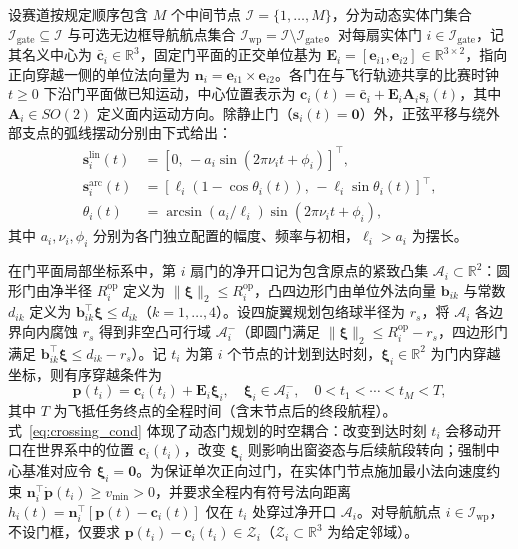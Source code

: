 \documentclass[journal]{IEEEtran}
\begin{document}
设赛道按规定顺序包含 $M$ 个中间节点 $\mathcal{I} = \{1, \ldots, M\}$，分为动态实体门集合 $\mathcal{I}_{\mathrm{gate}} \subseteq \mathcal{I}$ 与可选无边框导航航点集合 $\mathcal{I}_{\mathrm{wp}} = \mathcal{I} \setminus \mathcal{I}_{\mathrm{gate}}$。对每扇实体门 $i \in \mathcal{I}_{\mathrm{gate}}$，记其名义中心为 $\bar{\mathbf{c}}_i \in \mathbb{R}^3$，固定门平面的正交单位基为 $\mathbf{E}_i = [\mathbf{e}_{i1}, \mathbf{e}_{i2}] \in \mathbb{R}^{3 \times 2}$，指向正向穿越一侧的单位法向量为 $\mathbf{n}_i = \mathbf{e}_{i1} \times \mathbf{e}_{i2}$。各门在与飞行轨迹共享的比赛时钟 $t \ge 0$ 下沿门平面做已知运动，中心位置表示为 $\mathbf{c}_i(t) = \bar{\mathbf{c}}_i + \mathbf{E}_i \mathbf{A}_i \mathbf{s}_i(t)$，其中 $\mathbf{A}_i \in SO(2)$ 定义面内运动方向。除静止门（$\mathbf{s}_i(t) = \mathbf{0}$）外，正弦平移与绕外部支点的弧线摆动分别由下式给出：
\begin{equation}
\begin{aligned}
\mathbf{s}_i^{\mathrm{lin}}(t) &= [0,\, -a_i \sin(2\pi \nu_i t + \phi_i)]^\top, \\
\mathbf{s}_i^{\mathrm{arc}}(t) &= [\ell_i(1 - \cos\theta_i(t)),\, -\ell_i \sin\theta_i(t)]^\top, \\
\theta_i(t) &= \arcsin(a_i / \ell_i)\sin(2\pi \nu_i t + \phi_i),
\end{aligned}
\label{eq:gate_motion}
\end{equation}
其中 $a_i, \nu_i, \phi_i$ 分别为各门独立配置的幅度、频率与初相，$\ell_i > a_i$ 为摆长。

在门平面局部坐标系中，第 $i$ 扇门的净开口记为包含原点的紧致凸集 $\mathcal{A}_i \subset \mathbb{R}^2$：圆形门由净半径 $R_i^{\mathrm{op}}$ 定义为 $\|\boldsymbol{\xi}\|_2 \le R_i^{\mathrm{op}}$，凸四边形门由单位外法向量 $\mathbf{b}_{ik}$ 与常数 $d_{ik}$ 定义为 $\mathbf{b}_{ik}^\top \boldsymbol{\xi} \le d_{ik}$（$k = 1, \ldots, 4$）。设四旋翼规划包络球半径为 $r_s$，将 $\mathcal{A}_i$ 各边界向内腐蚀 $r_s$ 得到非空凸可行域 $\mathcal{A}_i^-$（即圆门满足 $\|\boldsymbol{\xi}\|_2 \le R_i^{\mathrm{op}} - r_s$，四边形门满足 $\mathbf{b}_{ik}^\top \boldsymbol{\xi} \le d_{ik} - r_s$）。记 $t_i$ 为第 $i$ 个节点的计划到达时刻，$\boldsymbol{\xi}_i \in \mathbb{R}^2$ 为门内穿越坐标，则有序穿越条件为
\begin{equation}
\mathbf{p}(t_i) = \mathbf{c}_i(t_i) + \mathbf{E}_i \boldsymbol{\xi}_i, \quad
\boldsymbol{\xi}_i \in \mathcal{A}_i^-, \quad
0 < t_1 < \cdots < t_M < T,
\label{eq:crossing_cond}
\end{equation}
其中 $T$ 为飞抵任务终点的全程时间（含末节点后的终段航程）。式~\eqref{eq:crossing_cond} 体现了动态门规划的时空耦合：改变到达时刻 $t_i$ 会移动开口在世界系中的位置 $\mathbf{c}_i(t_i)$，改变 $\boldsymbol{\xi}_i$ 则影响出窗姿态与后续航段转向；强制中心基准对应令 $\boldsymbol{\xi}_i = \mathbf{0}$。为保证单次正向过门，在实体门节点施加最小法向速度约束 $\mathbf{n}_i^\top \dot{\mathbf{p}}(t_i) \ge v_{\min} > 0$，并要求全程内有符号法向距离 $h_i(t) = \mathbf{n}_i^\top[\mathbf{p}(t) - \mathbf{c}_i(t)]$ 仅在 $t_i$ 处穿过净开口 $\mathcal{A}_i$。对导航航点 $i \in \mathcal{I}_{\mathrm{wp}}$，不设门框，仅要求 $\mathbf{p}(t_i) - \mathbf{c}_i(t_i) \in \mathcal{Z}_i$（$\mathcal{Z}_i \subset \mathbb{R}^3$ 为给定邻域）。
\end{document}
